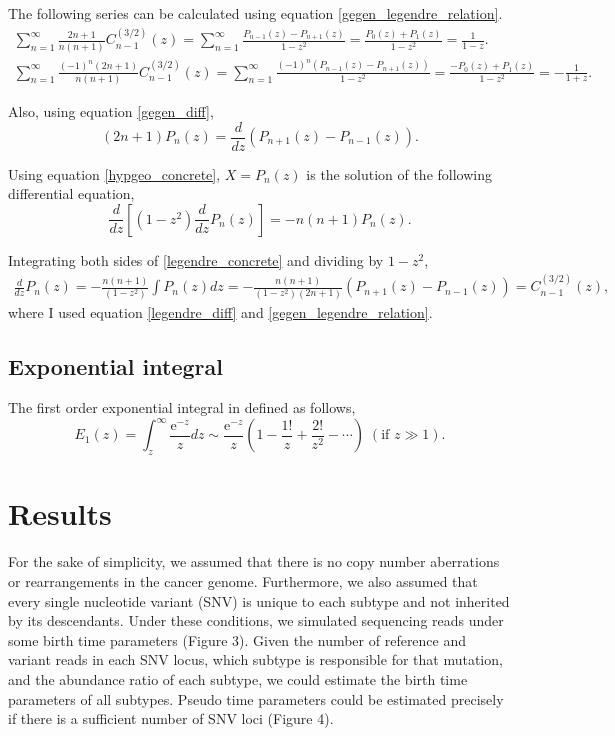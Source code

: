 \documentclass[12pt]{article}
\newcommand{\napier}{\mathrm{e}}
\newcommand{\bibun}[2]{\frac{d {#1}}{d {#2}}}
\begin{document}
The following series can be calculated using equation \eqref{gegen_legendre_relation}.
\begin{gather}
 \sum_{n=1}^{\infty}\frac{2n+1}{n(n+1)} C^{(3/2)}_{n-1} (z) = \sum_{n=1}^{\infty} \frac{P_{n-1}(z) - P_{n+1}(z)}{1-z^2} = \frac{P_{0}(z) + P_{1}(z)}{1-z^2} = \frac{1}{1-z}.\label{frac_1_1-z}\\
 \sum_{n=1}^{\infty}  \frac{(-1)^n(2n+1)}{n(n+1)} C^{(3/2)}_{n-1} (z) = \sum_{n=1}^{\infty} \frac{(-1)^n (P_{n-1}(z) - P_{n+1}(z))}{1-z^2} = \frac{-P_{0}(z) + P_{1}(z)}{1-z^2} = -\frac{1}{1+z}\label{-frac_1_1+z}.
\end{gather}

Also, using equation \eqref{gegen_diff},
\begin{equation}
 (2n+1)P_n(z) = \bibun{}{z} \left( P_{n+1} (z) - P_{n-1} (z) \right).\label{legendre_diff}
\end{equation}

Using equation \eqref{hypgeo_concrete}, $X = P_n(z)$ is the solution of the following differential equation,
\begin{equation}
 \bibun{}{z} \left[ (1-z^2) \bibun{}{z} P_n(z) \right] = - n(n+1)P_n(z).\label{legendre_concrete}
\end{equation}

Integrating both sides of \eqref{legendre_concrete} and dividing by $1-z^2$,
\begin{align}
 \bibun{}{z} P_n(z) = -\frac{n(n+1)}{(1 - z^2)} \int P_n(z) dz = -\frac{n(n+1)}{(1-z^2) (2n+1)} \left(P_{n+1} (z) - P_{n-1}(z)\right) = C^{(3/2)}_{n-1} (z),\label{ledgendre_diff_to_gegen}
\end{align}
where I used equation \eqref{legendre_diff} and \eqref{gegen_legendre_relation}.

\subsection{Exponential integral}
The first order exponential integral in defined as follows,
\begin{equation}
 E_1(z) = \int_{z}^{\infty} \frac{\napier^{-z}}{z} dz \sim \frac{\napier^{-z}}{z} \left( 1 - \frac{1!}{z} + \frac{2!}{z^2} - \cdots \right) \; (\text{if } z \gg 1 ).
\end{equation}

\section{Results}
For the sake of simplicity, we assumed that there is no copy number aberrations or rearrangements in the cancer genome. Furthermore, we also assumed that every single nucleotide variant (SNV) is unique to each subtype and not inherited by its descendants. Under these conditions, we simulated sequencing reads under some birth time parameters (Figure 3). Given the number of reference and variant reads in each SNV locus, which subtype is responsible for that mutation, and the abundance ratio of each subtype, we could estimate the birth time parameters of all subtypes. Pseudo time parameters could be estimated precisely if there is a sufficient number of SNV loci (Figure 4).
\end{document}
